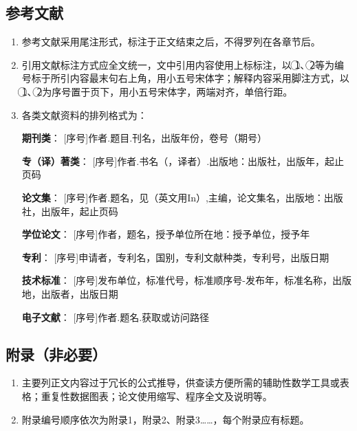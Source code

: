 \subsection{参考文献}

\begin{enumerate}[label=\arabic*)]
	\item 参考文献采用尾注形式，标注于正文结束之后，不得罗列在各章节后。
	
	\item 引用文献标注方式应全文统一，文中引用内容使用上标标注，以 \textcircled{1}、\textcircled{2}等为编号标于所引内容最末句右上角，用小五号宋体字；解释内容采用脚注方式，以\textcircled{1}、\textcircled{2}为序号置于页下，用小五号宋体字，两端对齐，单倍行距。
	
	\item 各类文献资料的排列格式为：
	
	{\bfseries 期刊类}：
	[序号]作者.题目.刊名，出版年份，卷号（期号）
	
	{\bfseries 专（译）著类}：
	[序号]作者.书名（，译者）.出版地：出版社，出版年，起止页码
	
	{\bfseries 论文集}：
	[序号]作者.题名，见（英文用In）,主编，论文集名，出版地：出版社，出版年，起止页码
	
	{\bfseries 学位论文}：
	[序号]作者，题名，授予单位所在地：授予单位，授予年
	
	{\bfseries 专利}：
	[序号]申请者，专利名，国别，专利文献种类，专利号，出版日期
	
	{\bfseries 技术标准}：
	[序号]发布单位，标准代号，标准顺序号-发布年，标准名称，出版地，出版者，出版日期
	
	{\bfseries 电子文献}：
	[序号]作者.题名.获取或访问路径
	
\end{enumerate}

\subsection{附录（非必要）}

\begin{enumerate}[label=\arabic*)]
	\item 主要列正文内容过于冗长的公式推导，供查读方便所需的辅助性数学工具或表格；重复性数据图表；论文使用缩写、程序全文及说明等。
	
	\item 附录编号顺序依次为附录1，附录2、附录3……，每个附录应有标题。
	
\end{enumerate}

